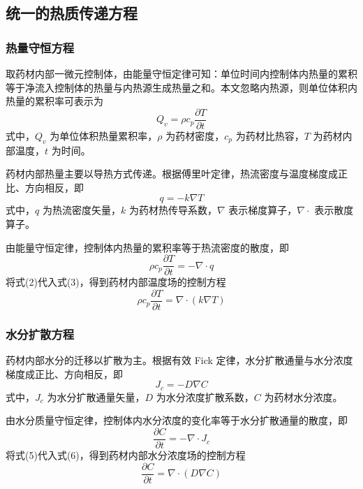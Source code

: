 \documentclass[withoutpreface,bwprint]{cumcm_thesis}
\begin{document}
\subsection{统一的热质传递方程}

\subsubsection{热量守恒方程}

取药材内部一微元控制体，由能量守恒定律可知：单位时间内控制体内热量的累积等于净流入控制体的热量与内热源生成热量之和。本文忽略内热源，则单位体积内热量的累积率可表示为
\begin{equation}
Q_v = \rho c_p \frac{\partial T}{\partial t}
\end{equation}
式中，\(Q_v\) 为单位体积热量累积率，\(\rho\) 为药材密度，\(c_p\) 为药材比热容，\(T\) 为药材内部温度，\(t\) 为时间。

药材内部热量主要以导热方式传递。根据傅里叶定律，热流密度与温度梯度成正比、方向相反，即
\begin{equation}
q = -k \nabla T
\end{equation}
式中，\(q\) 为热流密度矢量，\(k\) 为药材热传导系数，\(\nabla\) 表示梯度算子，\(\nabla \cdot\) 表示散度算子。

由能量守恒定律，控制体内热量的累积率等于热流密度的散度，即
\begin{equation}
\rho c_p \frac{\partial T}{\partial t} = -\nabla \cdot q
\end{equation}
将式(2)代入式(3)，得到药材内部温度场的控制方程
\begin{equation}
\rho c_p \frac{\partial T}{\partial t} = \nabla \cdot (k \nabla T)
\end{equation}

\subsubsection{水分扩散方程}

药材内部水分的迁移以扩散为主。根据有效 Fick 定律，水分扩散通量与水分浓度梯度成正比、方向相反，即
\begin{equation}
J_c = -D \nabla C
\end{equation}
式中，\(J_c\) 为水分扩散通量矢量，\(D\) 为水分浓度扩散系数，\(C\) 为药材水分浓度。

由水分质量守恒定律，控制体内水分浓度的变化率等于水分扩散通量的散度，即
\begin{equation}
\frac{\partial C}{\partial t} = -\nabla \cdot J_c
\end{equation}
将式(5)代入式(6)，得到药材内部水分浓度场的控制方程
\begin{equation}
\frac{\partial C}{\partial t} = \nabla \cdot (D \nabla C)
\end{equation}
\end{document}
